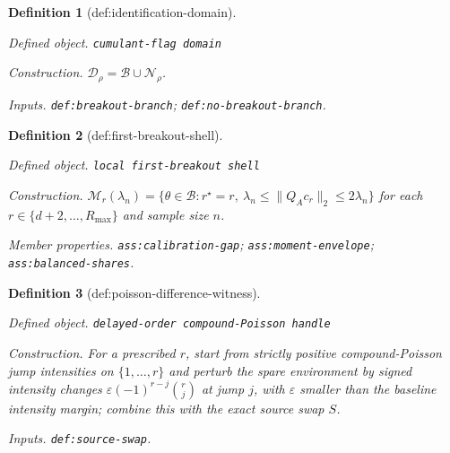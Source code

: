 \documentclass{article}
\newtheorem{definition}{Definition}
\begin{document}
\begin{definition}[def:identification-domain]\label{def:identification-domain}
\par\smallskip\noindent\emph{Defined object.} \texttt{cumulant-\allowbreak{}flag domain}
\par\smallskip\noindent\emph{Construction.} \(\mathcal D_\rho=\mathcal B\cup\mathcal N_\rho\).
\par\smallskip\noindent\emph{Inputs.} \texttt{def:\allowbreak{}breakout-\allowbreak{}branch}; \texttt{def:\allowbreak{}no-\allowbreak{}breakout-\allowbreak{}branch}.
\end{definition}

\begin{definition}[def:first-breakout-shell]\label{def:first-breakout-shell}
\par\smallskip\noindent\emph{Defined object.} \texttt{local first-\allowbreak{}breakout shell}
\par\smallskip\noindent\emph{Construction.} \(\mathcal M_r(\lambda_n)=\{\theta\in\mathcal B:r^\star=r,\ \lambda_n\le\lVert Q_Ac_r\rVert_2\le2\lambda_n\}\) for each \(r\in\{d+2,\ldots,R_{\max}\}\) and sample size \(n\).
\par\smallskip\noindent\emph{Member properties.} \texttt{ass:\allowbreak{}calibration-\allowbreak{}gap}; \texttt{ass:\allowbreak{}moment-\allowbreak{}envelope}; \texttt{ass:\allowbreak{}balanced-\allowbreak{}shares}.
\end{definition}

\begin{definition}[def:poisson-difference-witness]\label{def:poisson-difference-witness}
\par\smallskip\noindent\emph{Defined object.} \texttt{delayed-\allowbreak{}order compound-\allowbreak{}Poisson handle}
\par\smallskip\noindent\emph{Construction.} For a prescribed \(r\), start from strictly positive compound-Poisson jump intensities on \(\{1,\ldots,r\}\) and perturb the spare environment by signed intensity changes \(\varepsilon(-1)^{r-j}{r\choose j}\) at jump \(j\), with \(\varepsilon\) smaller than the baseline intensity margin; combine this with the exact source swap \(S\).
\par\smallskip\noindent\emph{Inputs.} \texttt{def:\allowbreak{}source-\allowbreak{}swap}.
\end{definition}
\end{document}
